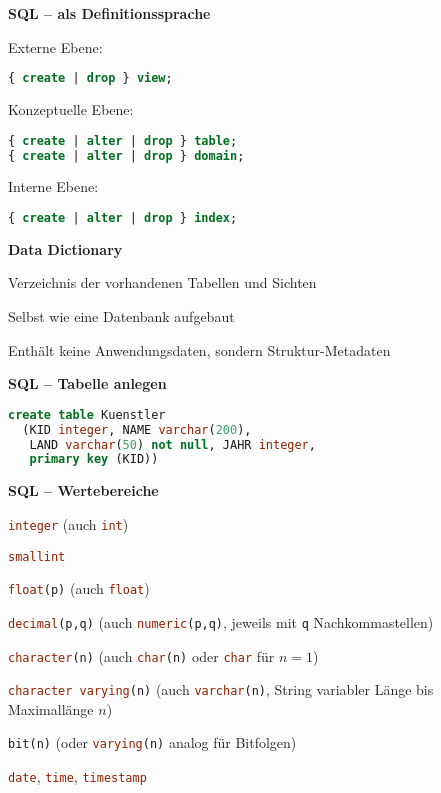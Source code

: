 \textbf{SQL -- als Definitionssprache}
\begin{enumeration}
	\item Externe Ebene: 
		\begin{lstlisting}[language=sql]
{ create | drop } view;
		\end{lstlisting}
	\item Konzeptuelle Ebene:
		\begin{lstlisting}[language=sql]
{ create | alter | drop } table;
{ create | alter | drop } domain;
		\end{lstlisting}
	\item Interne Ebene:
			\begin{lstlisting}[language=sql]
{ create | alter | drop } index;
		\end{lstlisting}
\end{enumeration}

\textbf{Data Dictionary}
\begin{items}
	\item Verzeichnis der vorhandenen Tabellen und Sichten
	\item Selbst wie eine Datenbank aufgebaut
	\item Enthält keine Anwendungsdaten, sondern Struktur-Metadaten
\end{items}

\textbf{SQL -- Tabelle anlegen}
\begin{items}
	\item \begin{lstlisting}[language=sql]
create table Kuenstler
  (KID integer, NAME varchar(200), 
   LAND varchar(50) not null, JAHR integer, 
   primary key (KID))
\end{lstlisting}
\end{items}

\textbf{SQL -- Wertebereiche}
\begin{items}
	\item \lstinline[language=sql]{integer} (auch \lstinline[language=sql]{int})
	\item \lstinline[language=sql]{smallint}
	\item \lstinline[language=sql]{float(p)} (auch \lstinline[language=sql]{float})
	\item \lstinline[language=sql]{decimal(p,q)} (auch \lstinline[language=sql]{numeric(p,q)}, jeweils mit \lstinline[language=sql]{q} Nachkommastellen)
	\item \lstinline[language=sql]{character(n)} (auch \lstinline[language=sql]{char(n)} oder \lstinline[language=sql]{char} für \( n=1 \))
	\item \lstinline[language=sql]{character varying(n)} (auch \lstinline[language=sql]{varchar(n)}, String variabler Länge bis Maximallänge \( n \))
	\item \lstinline[language=sql]{bit(n)} (oder \lstinline[language=sql]{varying(n)} analog für Bitfolgen)
	\item \lstinline[language=sql]{date}, \lstinline[language=sql]{time}, \lstinline[language=sql]{timestamp}
\end{items}

